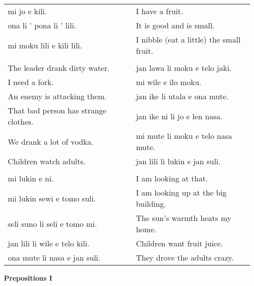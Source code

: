 \begin{supertabular}{p{5,5cm}|ll}
mi jo e kili.  &&  I have a fruit. \\
ona li ' pona li ' lili. && It is good and is small. \\
mi moku lili e kili lili.  && I nibble (eat a little) the small fruit. \\
 && \\ %
The leader drank dirty water.  && jan lawa li moku e telo jaki. \\ %
I need a fork.  && mi wile e ilo moku. \\ %
An enemy is attacking them. && jan ike li utala e ona mute. \\ %
That bad person has strange clothes.  && jan ike ni li jo e len nasa. \\ %
We drank a lot of vodka.  && mi mute li moku e telo nasa mute. \\ %
Children watch adults.  && jan lili li lukin e jan suli. \\ %
 && \\ %
mi lukin e ni. && I am looking at that. \\ 
mi lukin sewi e tomo suli.  && I am looking up at the big building. \\
seli suno li seli e tomo mi.  && The sun's warmth heats my home.  \\
jan lili li wile e telo kili.  && Children want fruit juice. \\
ona mute li nasa e jan suli.  && They drove the adults crazy. \\
\end{supertabular} 

\textbf{Prepositions I} 
\label{'prepositions01'}

